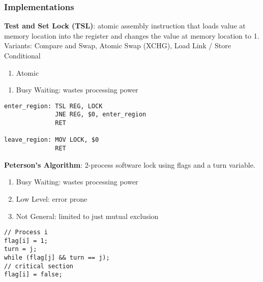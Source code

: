 \documentclass[12pt, a4paper]{article}
\begin{document}
\begin{multicols*}{3}
\subsubsection{Implementations} \textbf{Test and Set Lock (TSL)}: atomic assembly instruction that loads value at memory location into the register and changes the value at memory location to 1.\\Variants: Compare and Swap, Atomic Swap (XCHG), Load Link / Store Conditional 
\begin{enumerate}[$+$]
  \item Atomic 
\end{enumerate}\vspace{-1pt}
\begin{enumerate}[$-$]
  \item Busy Waiting: wastes processing power
\end{enumerate}
\vspace{2pt}
\begin{lstlisting}
enter_region: TSL REG, LOCK 
              JNE REG, $0, enter_region 
              RET 

leave_region: MOV LOCK, $0 
              RET
\end{lstlisting}

\colbreak

\textbf{Peterson's Algorithm}: 2-process software lock using flags and a turn variable.
\begin{enumerate}[$-$]
  \item Busy Waiting: wastes processing power
  \item Low Level: error prone
  \item Not General: limited to just mutual exclusion 
\end{enumerate}
\begin{lstlisting}
// Process i
flag[i] = 1;
turn = j;
while (flag[j] && turn == j);
// critical section
flag[i] = false;
\end{lstlisting}


\end{multicols*}
\end{document}
